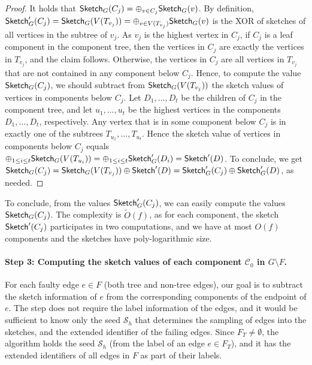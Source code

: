 \begin{proof}
It holds that $\mathsf{Sketch}_G(C_j) = \oplus_{v \in C_j} \mathsf{Sketch}_G(v)$. By definition, $\mathsf{Sketch}'_G(C_j)=\mathsf{Sketch}_G(V(T_{v_j})) = \oplus_{v \in V(T_{v_j})} \mathsf{Sketch}_G(v)$ is the XOR of sketches of all vertices in the subtree of $v_j$. As $v_j$ is the highest vertex in $C_j$, if $C_j$ is a leaf component in the component tree, then the vertices in $C_j$ are exactly the vertices in $T_{v_j}$, and the claim follows. Otherwise, the vertices in $C_j$ are all vertices in $T_{v_j}$ that are not contained in any component below $C_j$. Hence, to compute the value $\mathsf{Sketch}_G(C_j)$, we should subtract from $\mathsf{Sketch}_G(V(T_{v_j}))$ the sketch values of vertices in components below $C_j$. Let $D_1,\ldots,D_t$ be the children of $C_j$ in the component tree, and let $u_1,\ldots,u_t$ be the highest vertices in the components $D_1,\ldots,D_t$, respectively. Any vertex that is in some component below $C_j$ is in exactly one of the subtrees $T_{u_1},\ldots,T_{u_t}$. Hence the sketch value of vertices in components below $C_j$ equals $\oplus_{1 \leq i \leq t} \mathsf{Sketch}_G(V(T_{u_i}))= \oplus_{1 \leq i \leq t} \mathsf{Sketch}'_G(D_i)=\mathsf{Sketch}'(D)$. To conclude, we get $\mathsf{Sketch}_G(C_j)=\mathsf{Sketch}_G(V(T_{v_j})) \oplus \mathsf{Sketch}'(D)=\mathsf{Sketch}'_G(C_j) \oplus \mathsf{Sketch}'_G(D)$, as needed.
\end{proof}

To conclude, from the values $\mathsf{Sketch}'_G(C_j)$, we can easily compute the values $\mathsf{Sketch}_G(C_j)$. The complexity is $\widetilde{O}(f)$, as for each component, the sketch $\mathsf{Sketch}'(C_j)$ participates in two computations, and we have at most $O(f)$ components and the sketches have poly-logarithmic size.


\paragraph{Step 3: Computing the sketch values of each component $\mathcal{C}_0$ in $G \setminus F$.} 
For each faulty edge $e \in F$ (both tree and non-tree edges), our goal is to subtract the sketch information of $e$ from the corresponding components of the endpoint of $e$. The step does not require the label information of the edges, and it would be sufficient to know only the seed $\mathcal{S}_h$ that determines the sampling of edges into the sketches, and the extended identifier of the failing edges. Since $F_T \neq \emptyset$, the algorithm holds the seed $\mathcal{S}_h$ (from the label of an edge $e \in F_T$), and it has the extended identifiers of all edges in $F$ as part of their labels. 

